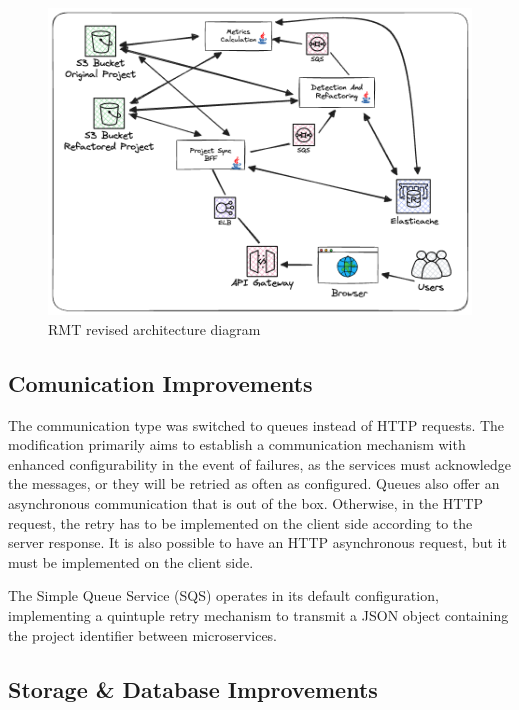 \begin{figure}[ht!]
\SetCaptionWidth{\textwidth}
\caption{RMT revised architecture diagram}
\label{fig-async}
\includegraphics[width =\textwidth, scale=0.2]{Chapter-5/Figures/Async.png}
\end{figure}
\FloatBarrier

\subsection{Comunication Improvements}
\label{sub-comunication}

The communication type was switched to queues instead of HTTP requests. The modification primarily aims to establish a communication mechanism with enhanced configurability in the event of failures, as the services must acknowledge the messages, or they will be retried as often as configured. Queues also offer an asynchronous communication that is out of the box. Otherwise, in the HTTP request, the retry has to be implemented on the client side according to the server response. It is also possible to have an HTTP asynchronous request, but it must be implemented on the client side.

The Simple Queue Service (SQS) operates in its default configuration, implementing a quintuple retry mechanism to transmit a JSON object containing the project identifier between microservices.

\subsection{Storage \& Database Improvements}
\label{sub-storage}

